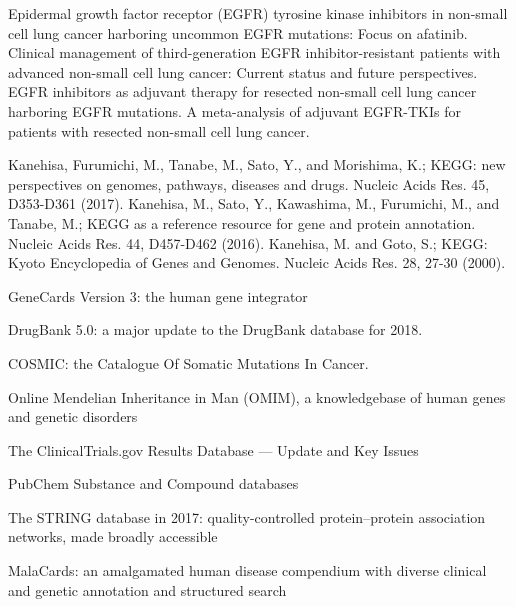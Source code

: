 
\begin{thebibliography}{00}

 Epidermal growth factor receptor (EGFR) tyrosine kinase inhibitors in non-small cell lung cancer harboring uncommon EGFR mutations: Focus on afatinib.
 Clinical management of third-generation EGFR inhibitor-resistant patients with advanced non-small cell lung cancer: Current status and future perspectives.
 EGFR inhibitors as adjuvant therapy for resected non-small cell lung cancer harboring EGFR mutations.
 A meta-analysis of adjuvant EGFR-TKIs for patients with resected non-small cell lung cancer.


 Kanehisa, Furumichi, M., Tanabe, M., Sato, Y., and Morishima, K.; 
\newblock KEGG: new perspectives on genomes, pathways, diseases and drugs. 
\newblock Nucleic Acids Res. 45, D353-D361 (2017).
 Kanehisa, M., Sato, Y., Kawashima, M., Furumichi, M., and Tanabe, M.; 
\newblock KEGG as a reference resource for gene and protein annotation. 
\newblock Nucleic Acids Res. 44, D457-D462 (2016).
 Kanehisa, M. and Goto, S.; 
\newblock KEGG: Kyoto Encyclopedia of Genes and Genomes. 
\newblock Nucleic Acids Res. 28, 27-30 (2000).


GeneCards Version 3: the human gene integrator

 DrugBank 5.0: a major update to the DrugBank database for 2018.

 COSMIC: the Catalogue Of Somatic Mutations In Cancer.

 Online Mendelian Inheritance in Man (OMIM), a knowledgebase of human genes and genetic disorders

 The ClinicalTrials.gov Results Database — Update and Key Issues

 PubChem Substance and Compound databases

 The STRING database in 2017: quality-controlled protein–protein association networks, made broadly accessible

 MalaCards: an amalgamated human disease compendium with diverse clinical and genetic annotation and structured search

\end{thebibliography}

